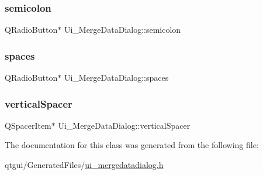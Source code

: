 \mbox{\label{class_ui___merge_data_dialog_aa974a43746080239589ea722f2b4d28a}} 
\subsubsection{\texorpdfstring{semicolon}{semicolon}}
{\footnotesize\ttfamily Q\+Radio\+Button$\ast$ Ui\+\_\+\+Merge\+Data\+Dialog\+::semicolon}

\mbox{\label{class_ui___merge_data_dialog_a748399e9f851d5220ab75548f7eadc3b}} 
\subsubsection{\texorpdfstring{spaces}{spaces}}
{\footnotesize\ttfamily Q\+Radio\+Button$\ast$ Ui\+\_\+\+Merge\+Data\+Dialog\+::spaces}

\mbox{\label{class_ui___merge_data_dialog_aa13e2b98b03564a23d6f7799e0533037}} 
\subsubsection{\texorpdfstring{verticalSpacer}{verticalSpacer}}
{\footnotesize\ttfamily Q\+Spacer\+Item$\ast$ Ui\+\_\+\+Merge\+Data\+Dialog\+::vertical\+Spacer}



The documentation for this class was generated from the following file\+:\begin{DoxyCompactItemize}
\item 
qtgui/\+Generated\+Files/\mbox{\hyperlink{ui__mergedatadialog_8h}{ui\+\_\+mergedatadialog.\+h}}\end{DoxyCompactItemize}
